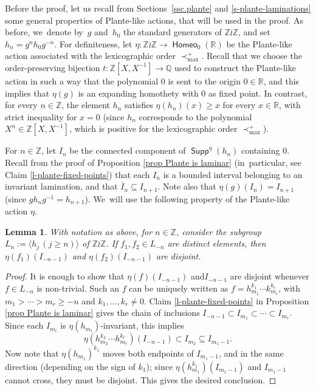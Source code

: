 \documentclass[JEP,XML,SOM,Unicode,NoFloatCountersInSection,published]{cedram}
\newtheorem{lem}[thm]{Lemma}
\theoremstyle{definition}
\DeclareMathOperator{\homeo}{\mathsf{Homeo}}
\DeclareMathOperator{\supp}{\mathsf{Supp}}
\newcommand{\R}{\mathbb{R}}
\newcommand{\Q}{\mathbb Q}
\newcommand{\Z}{\mathbb Z}
\begin{document}
Before the proof, let us recall from Sections~\ref{ssc.plante} and \ref{s-plante-laminations} some general properties of Plante-like actions, that will be used in the proof.
As before, we~denote by~$g$ and~$h_0$ the standard generators of $\Z \wr \Z$, and set $h_n=g^n h_0g^{-n}$. For definiteness, let $\eta\colon \Z\wr\Z\to \homeo_0(\R)$ be the Plante-like action associated with the lexicographic order $\prec_{\max}^{+}$. Recall that we choose the order-preserving bijection $t\colon \Z[X, X^{-1}]\to \Q$ used to construct the Plante-like action in such a way that the polynomial 0 is sent to the origin $0\in \R$, and this implies that $\eta(g)$ is an expanding homothety with $0$ as fixed point. In contrast, for every $n\in \Z$, the element $h_n$ satisfies $\eta(h_n)(x)\ge x$ for every $x\in \R$, with strict inequality for $x=0$ (since $h_n$ corresponds to the polynomial $X^n\in \Z[X, X^{-1}]$, which is positive for the lexicographic order $\prec_{\max}^+$).

For $n\in \Z$, let $I_n$ be the connected component of $\supp^\eta(h_n)$ containing $0$. Recall from the proof of Proposition \ref{prop Plante is laminar} (in~particular, see Claim \ref{l-plante-fixed-points}) that each $I_n$ is a bounded interval belonging to an invariant lamination, and that $\overline{I}_n\subseteq I_{n+1}$. Note also that $\eta(g)(I_n)=I_{n+1}$ (since $gh_ng^{-1}=h_{n+1}$). We~will use the following property of the Plante-like action $\eta$.
\begin{lem} \label{l-disjoint-intervals}
With notation as above, for $n\in \Z$, consider the subgroup $L_n:=\langle h_j\, (j\geq n)\rangle$ of $\Z\wr \Z$.
If $f_1, f_2\in L_{-n}$ are distinct elements, then $\eta(f_1)(I_{-n-1})$ and $\eta(f_2)(I_{-n-1})$ are disjoint.
\end{lem}

\begin{proof}
It is enough to show that $\eta(f)(I_{-n-1})$ and$I_{-n-1}$ are disjoint whenever $f\in L_{-n}$ is non-trivial. Such an $f$ can be uniquely written as $f=h_{m_1}^{k_1}\cdots k_{m_r}^{k_r}$, with $m_1>\cdots >m_r\ge -n$ and $k_1,\ldots, k_r\neq 0$. Claim \ref{l-plante-fixed-points} in Proposition \ref{prop Plante is laminar} gives the chain of inclusions $I_{-n-1}\subset I_{m_1}\subset \cdots \subset I_{m_r}$. Since each $I_{m_i}$ is $\eta(h_{m_i})$-invariant, this implies
\[\eta(h_{m_2}^{k_2}\cdots h_{m_r}^{k_r})(I_{-n-1})\subset I_{m_2}\subseteq I_{m_1-1}.
\]
Now note that $\eta(h_{m_1})^{k_1}$ moves both endpoints of $I_{m_1-1}$, and in the same direction (depending on the sign of $k_1$); since $\eta(h_{m_1}^{k_1})(I_{m_1-1})$ and $I_{m_1-1}$ cannot cross, they must be disjoint. This gives the desired conclusion.
\end{proof}
\end{document}
